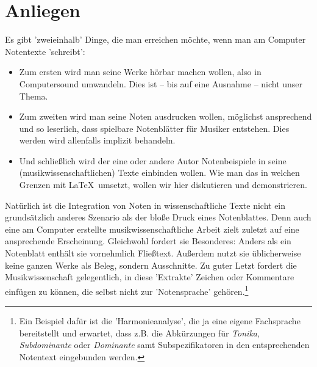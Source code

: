 %
%
%



\section{Anliegen}

Es gibt 'zweieinhalb' Dinge, die man erreichen möchte, wenn man am Computer
Notentexte 'schreibt':

\begin{itemize}
  \item Zum ersten wird man seine Werke hörbar machen wollen, also in
  Computersound umwandeln. Dies ist -- bis auf eine Ausnahme -- nicht
  unser Thema.
  \item Zum zweiten wird man seine Noten ausdrucken wollen, möglichst
  ansprechend und so leserlich, dass spielbare Notenblätter für Musiker
  entstehen. Dies werden wird allenfalls implizit behandeln.
  \item Und schließlich wird der eine oder andere Autor Notenbeispiele in seine
  (musikwissenschaftlichen) Texte einbinden wollen. Wie man das in welchen
  Grenzen mit \LaTeX\ umsetzt, wollen wir hier diskutieren und demonstrieren.
\end{itemize}

Natürlich ist die Integration von Noten in wissenschaftliche Texte nicht ein
grundsätzlich anderes Szenario als der bloße Druck eines Notenblattes.
Denn auch eine am Computer erstellte musikwissenschaftliche Arbeit zielt zuletzt
auf eine ansprechende Erscheinung. Gleichwohl fordert sie Besonderes: Anders als
ein Notenblatt enthält sie vornehmlich Fließtext. Außerdem nutzt sie
üblicherweise keine ganzen Werke als Beleg, sondern Ausschnitte. Zu guter Letzt
fordert die Musikwissenschaft gelegentlich, in diese 'Extrakte' Zeichen oder
Kommentare einfügen zu können, die selbst nicht zur 'Notensprache'
gehören.\footnote{Ein Beispiel dafür ist die 'Harmonieanalyse', die ja eine
eigene Fachsprache bereitstellt und erwartet, dass z.B. die Abkürzungen für
\textit{Tonika}, \textit{Subdominante} oder \textit{Dominante} samt
Subspezifikatoren in den entsprechenden Notentext eingebunden werden.}

